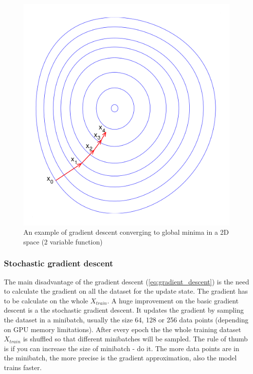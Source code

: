 \documentclass[times, utf8, diplomski]{fer}
\begin{document}
\begin{figure}
  \includegraphics[scale=0.5]{figures/gradient_descent.png}
  \centering
  \caption{An example of gradient descent converging to global minima in a 2D space (2 variable function)}
  \label{fig:local_and_global_function_values}
\end{figure}

\subsubsection{Stochastic gradient descent}
\label{se:stochastic_gd}

The main disadvantage of the gradient descent (\ref{eq:gradient_descent}) is the need to calculate the gradient on all the dataset for the update state. The gradient has to be calculate on the whole $X_{train}$. A huge improvement on the basic gradient descent is a the stochastic gradient descent. It updates the gradient by sampling the dataset in a minibatch, usually the size 64, 128 or 256 data points (depending on GPU memory limitations). After every epoch the the whole training dataset $X_{train}$ is shuffled so that different minibatches will be sampled. The rule of thumb is if you can increase the size of minibatch - do it. The more data points are in the minibatch, the more precise is the gradient approximation, also the model trains faster.
\end{document}
